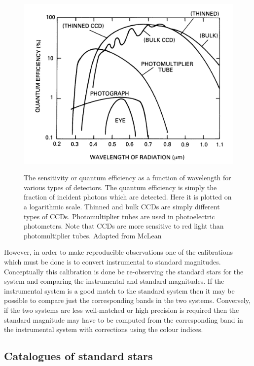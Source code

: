 \documentclass[twoside,11pt]{article}
\begin{document}
\begin{figure}[htbp]
   \centering
   \includegraphics[totalheight=3in]{sc6_sensitivity}
   \begin{quote}
   \caption[The wavelength sensitivity of various types of detectors]
    {The sensitivity or quantum efficiency as a function of wavelength for
    various types of detectors.  The quantum efficiency is simply the
    fraction of incident photons which are detected.  Here it is plotted
    on a logarithmic scale.  Thinned and bulk CCDs are simply different
    types of CCDs.  Photomultiplier tubes are used in photoelectric
    photometers.  Note that CCDs are more sensitive to red light than
    photomultiplier tubes.  Adapted from McLean\cite{MCLEAN97}
   \label{SENSITIVITY} }
   \end{quote}
\end{figure}

However, in order to make reproducible observations one of the
calibrations which must be done is to convert instrumental to standard
magnitudes.  Conceptually this calibration is done be re-observing
the standard stars for the system and comparing the instrumental and
standard magnitudes.  If the instrumental system is a good match to the
standard system then it may be possible to compare just the
corresponding bands in the two systems.  Conversely, if the two systems
are less well-matched or high precision is required then the standard
magnitude may have to be computed from the corresponding band in the
instrumental system with corrections using the colour indices.

\subsection{\label{CATS}Catalogues of standard stars}
\end{document}
